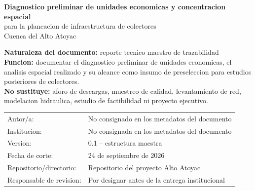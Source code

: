 \documentclass[11pt,letterpaper]{article}
\begin{document}
\begin{titlepage}
\centering
\vspace*{2.0cm}
{\Huge\bfseries\color{AtoyacBlue} Diagnostico preliminar de unidades economicas y concentracion espacial\\[0.5em]}
{\LARGE para la planeacion de infraestructura de colectores\\[1.0em]}
{\Large Cuenca del Alto Atoyac}\par
\vspace{1.8cm}

\begin{tcolorbox}[colback=AtoyacLight,colframe=AtoyacGreen,width=0.9\textwidth]
\centering
\textbf{Naturaleza del documento:} reporte tecnico maestro de trazabilidad\\[0.4em]
\textbf{Funcion:} documentar el diagnostico preliminar de unidades economicas, el analisis espacial realizado y su alcance como insumo de preseleccion para estudios posteriores de colectores.\\[0.4em]
\textbf{No sustituye:} aforo de descargas, muestreo de calidad, levantamiento de red, modelacion hidraulica, estudio de factibilidad ni proyecto ejecutivo.
\end{tcolorbox}

\vfill
\begin{tabular}{ll}
Autor/a: & No consignado en los metadatos del documento \\
Institucion: & No consignada en los metadatos del documento \\
Version: & 0.1 -- estructura maestra \\
Fecha de corte: & 24 de septiembre de 2026 \\
Repositorio/directorio: & Repositorio del proyecto Alto Atoyac \\
Responsable de revision: & Por designar antes de la entrega institucional \\
\end{tabular}
\vfill
\end{titlepage}

\tableofcontents
\newpage
\end{document}
